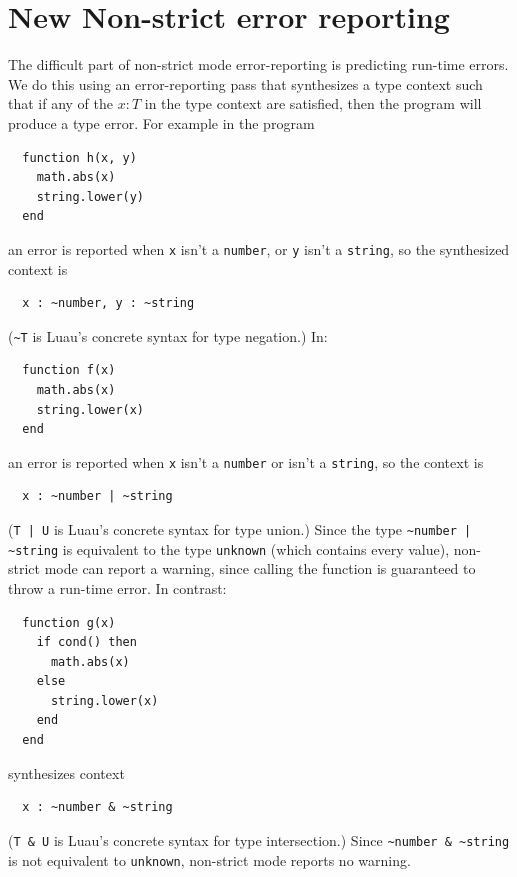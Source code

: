 \documentclass[sigplan]{acmart}
\begin{document}
\section{New Non-strict error reporting}

The difficult part of non-strict mode error-reporting is predicting
run-time errors. We do this using an error-reporting
pass that synthesizes a type context such that if any of the $x : T$ in
the type context are satisfied, then the program will
produce a type error. For example in the program
\begin{verbatim}
  function h(x, y)
    math.abs(x)
    string.lower(y)
  end
\end{verbatim}
an error is reported when \verb|x| isn’t a \verb|number|, or \verb|y| isn’t a \verb|string|, so the synthesized context is
\begin{verbatim}
  x : ~number, y : ~string
\end{verbatim}
(\verb|~T| is Luau's concrete syntax for type negation.)
In:
\begin{verbatim}
  function f(x)
    math.abs(x)
    string.lower(x)
  end
\end{verbatim}
an error is reported when \verb|x| isn’t a \verb|number| or isn’t a \verb|string|, so the context is
\begin{verbatim}
  x : ~number | ~string
\end{verbatim}
(\verb"T | U" is Luau's concrete syntax for type union.)
Since the type \verb"~number | ~string" is equivalent to the type \verb|unknown| (which contains every value),
non-strict mode can report a warning, since calling the function is guaranteed to throw a run-time error.
In contrast:
\begin{verbatim}
  function g(x)
    if cond() then
      math.abs(x)
    else
      string.lower(x)
    end
  end
\end{verbatim}
synthesizes context
\begin{verbatim}
  x : ~number & ~string
\end{verbatim}
(\verb|T & U| is Luau's concrete syntax for type intersection.)
Since \verb|~number & ~string| is not equivalent to \verb|unknown|, non-strict mode reports no warning.
\end{document}

